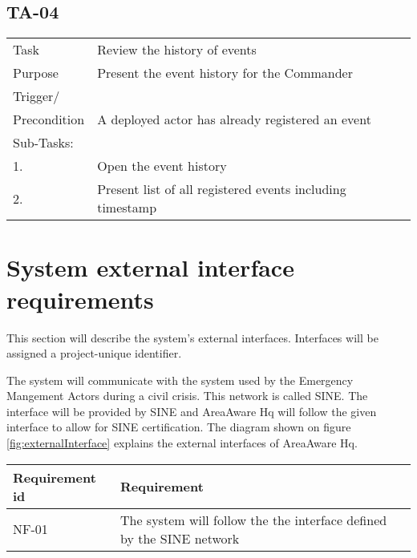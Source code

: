 \subsection{TA-04}

\begin{longtable}{| p{2.5cm}  | p{10cm} |  }
	\hline
	Task & Review the history of events \\
	Purpose & Present the event history for the Commander \\
	Trigger/ &  \\ Precondition & A deployed actor has already registered an event \\
	\hline
	Sub-Tasks: & \\
	1. & Open the event history \\
	2. & Present list of all registered events including timestamp  \\
	\hline
\end{longtable}

\FloatBarrier
\newpage

\section{System external interface requirements}
This section will describe the system’s external interfaces. Interfaces will be assigned a project-unique identifier. 

The system will communicate with the system used by the Emergency Mangement Actors during a civil crisis. This network is called SINE. The interface will be provided by SINE and AreaAware Hq will follow the given interface to allow for SINE certification. The diagram shown on figure \ref{fig:externalInterface} explains the external interfaces of AreaAware Hq.


\begin{longtable}{| p{3.2cm} |  p{10cm} | }
	\hline
	\textbf{Requirement id} &  \textbf{Requirement } \\
	\hline
	NF-01 & The system will follow the the interface defined by the SINE network  \\
	\hline
\end{longtable}


